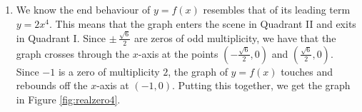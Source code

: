 {\begin{enumerate}
{so the quotient after dividing twice by $x+1$ is $2x^2-3$.}

\smallskip

Setting the quotient polynomial equal to zero yields $2x^2 - 3 = 0$, so that $x^2 = \frac{3}{2}$, or $x = \pm \, \frac{\sqrt{6}}{2}$.  Descartes' Rule of Signs tells us that the positive real zero we found, $\frac{\sqrt{6}}{2}$, has multiplicity $1$.  Descartes also tells us the total multiplicity of negative real zeros is $3$, which forces $-1$ to be a zero of multiplicity $2$ and $- \frac{\sqrt{6}}{2}$ to have multiplicity $1$.  

\item  We know the end behaviour of $y=f(x)$ resembles that of its leading term $y=2x^4$.  This means that the graph enters the scene in Quadrant II and exits in Quadrant I.  Since $\pm \, \frac{\sqrt{6}}{2}$ are zeros of odd multiplicity, we have that the graph crosses through the $x$-axis at the points $\left( -\frac{\sqrt{6}}{2}, 0 \right)$ and $\left( \frac{\sqrt{6}}{2}, 0 \right)$.  Since $-1$ is a zero of multiplicity $2$, the graph of $y=f(x)$ touches and rebounds off the $x$-axis at $(-1,0)$.  Putting this together, we get the graph in Figure \ref{fig:realzero4}.
\end{enumerate}
}

{}

